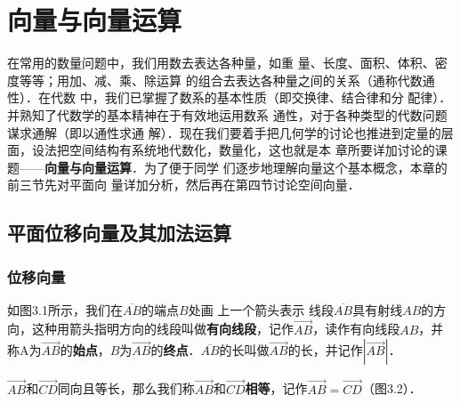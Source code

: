 \chapter{向量与向量运算}
在常用的数量问题中，我们用数去表达各种量，如重
量、长度、面积、体积、密度等等；用加、减、乘、除运算
的组合去表达各种量之间的关系（通称代数通性）．在代数
中，我们已掌握了数系的基本性质（即交换律、结合律和分
配律）．并熟知了代数学的基本精神在于有效地运用数系
通性，对于各种类型的代数问题谋求通解（即以通性求通
解）．现在我们要着手把几何学的讨论也推进到定量的层
面，设法把空间结构有系统地代数化，数量化，这也就是本
章所要详加讨论的课题——\textbf{向量与向量运算}．为了便于同学
们逐步地理解向量这个基本概念，本章的前三节先对平面向
量详加分析，然后再在第四节讨论空间向量．

\section{平面位移向量及其加法运算}

\subsection{位移向量}

如图3.1所示，我们在$\overline{AB}$的端点$B$处画
上一个箭头表示 线段$\overline{AB}$具有射线$AB$的方向，这种用箭头指明方向的线段叫做\textbf{有向线段}，记作$\Vec{AB}$，读作有向线段$AB$，并称A为$\Vec{AB}$的\textbf{始点}，$B$为$\Vec{AB}$的\textbf{终点}．$\overline{AB}$的长叫做$\Vec{AB}$的长，并记作$|\Vec{AB}|$．

$\Vec{AB}$和$\Vec{CD}$同向且等长，那么我们称$\Vec{AB}$和$\Vec{CD}$\textbf{相等}，记作$\Vec{AB}=\Vec{CD}$（图3.2）．

\begin{figure}[htp]\centering
    \begin{minipage}[t]{0.48\textwidth}
    \centering
{}
    \caption{}
    \end{minipage}
    \begin{minipage}[t]{0.48\textwidth}
    \centering
    \caption{}
    \end{minipage}
    \end{figure}

